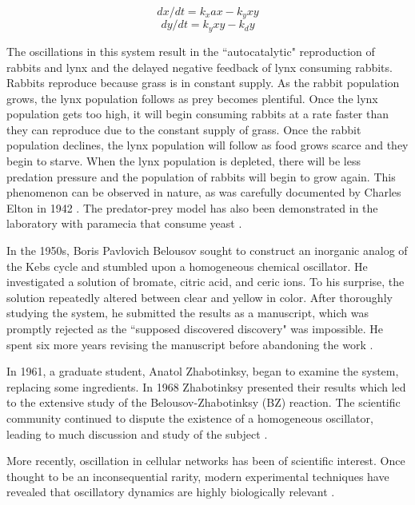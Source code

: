 \documentclass[12pt]{report}
\begin{document}
\begin{equation}
dx/dt = k_{x}ax - k_{y}xy
\end{equation}
\begin{equation}
dy/dt = k_{y}xy - k_{d}y
\end{equation}

The oscillations in this system result in the ``autocatalytic" reproduction of rabbits and lynx and the delayed negative feedback of lynx consuming rabbits. Rabbits reproduce because grass is in constant supply. As the rabbit population grows, the lynx population follows as prey becomes plentiful. Once the lynx population gets too high, it will begin consuming rabbits at a rate faster than they can reproduce due to the constant supply of grass. Once the rabbit population declines, the lynx population will follow as food grows scarce and they begin to starve. When the lynx population is depleted, there will be less predation pressure and the population of rabbits will begin to grow again. This phenomenon can be observed in nature, as was carefully documented by Charles Elton in 1942 \cite{Elton1942}. The predator-prey model has also been demonstrated in the laboratory with paramecia that consume yeast \cite{Gause}.

In the 1950s, Boris Pavlovich Belousov sought to construct an inorganic analog of the Kebs cycle and stumbled upon a homogeneous chemical oscillator. He investigated a solution of bromate, citric acid, and ceric ions. To his surprise, the solution repeatedly altered between clear and yellow in color. After thoroughly studying the system, he submitted the results as a manuscript, which was promptly rejected as the ``supposed discovered discovery" was impossible. He spent six more years revising the manuscript before abandoning the work \cite{epstein_introduction_1998}.

In 1961, a graduate student, Anatol Zhabotinksy, began to examine the system, replacing some ingredients. In 1968 Zhabotinksy presented their results which led to the extensive study of the Belousov-Zhabotinksy (BZ) reaction. The scientific community continued to dispute the existence of a homogeneous oscillator, leading to much discussion and study of the subject \cite{epstein_design_1984}.

More recently, oscillation in cellular networks has been of scientific interest. Once thought to be an inconsequential rarity, modern experimental techniques have revealed that oscillatory dynamics are highly biologically relevant \cite{Sauro_dynamics}.
\end{document}
